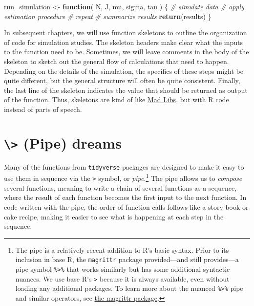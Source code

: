 \documentclass[
]{book}
\newenvironment{Shaded}{\begin{snugshade}}{\end{snugshade}}
\newcommand{\CommentTok}[1]{\textcolor[rgb]{0.56,0.35,0.01}{\textit{#1}}}
\newcommand{\ControlFlowTok}[1]{\textcolor[rgb]{0.13,0.29,0.53}{\textbf{#1}}}
\newcommand{\FunctionTok}[1]{\textcolor[rgb]{0.13,0.29,0.53}{\textbf{#1}}}
\newcommand{\NormalTok}[1]{#1}
\newcommand{\OtherTok}[1]{\textcolor[rgb]{0.56,0.35,0.01}{#1}}
\begin{document}
\begin{Shaded}
\begin{Highlighting}[]
\NormalTok{run\_simulation }\OtherTok{\textless{}{-}} \ControlFlowTok{function}\NormalTok{( N, J, mu, sigma, tau ) \{}
  \CommentTok{\# simulate data}
  \CommentTok{\# apply estimation procedure}
  \CommentTok{\# repeat}
  \CommentTok{\# summarize results}
  \FunctionTok{return}\NormalTok{(results)}
\NormalTok{\}}
\end{Highlighting}
\end{Shaded}

In subsequent chapters, we will use function skeletons to outline the organization of code for simulation studies.
The skeleton headers make clear what the inputs to the function need to be.
Sometimes, we will leave comments in the body of the skeleton to sketch out the general flow of calculations that need to happen.
Depending on the details of the simulation, the specifics of these steps might be quite different, but the general structure will often be quite consistent.
Finally, the last line of the skeleton indicates the value that should be returned as output of the function.
Thus, skeletons are kind of like \href{https://www.madlibs.com/}{Mad Libs}, but with R code instead of parts of speech.

\section{\texorpdfstring{\texttt{\textbackslash{}\textgreater{}} (Pipe) dreams}{\textbackslash\textgreater{} (Pipe) dreams}}\label{pipe-dreams}

Many of the functions from \texttt{tidyverse} packages are designed to make it easy to use them in sequence via the \texttt{\textbar{}\textgreater{}} symbol, or \emph{pipe}.\footnote{The pipe is a relatively recent addition to R's basic syntax. Prior to its inclusion in base R, the \texttt{magrittr} package provided---and still provides---a pipe symbol \texttt{\%\textgreater{}\%} that works similarly but has some additional syntactic nuances. We use base R's \texttt{\textbar{}\textgreater{}} because it is always available, even without loading any additional packages. To learn more about the nuanced \texttt{\%\textgreater{}\%} pipe and similar operators, see \href{https://magrittr.tidyverse.org/articles/magrittr.html}{the magrittr package}.}
The pipe allows us to \emph{compose} several functions, meaning to write a chain of several functions as a sequence, where the result of each function becomes the first input to the next function.
In code written with the pipe, the order of function calls follows like a story book or cake recipe, making it easier to see what is happening at each step in the sequence.
\end{document}
